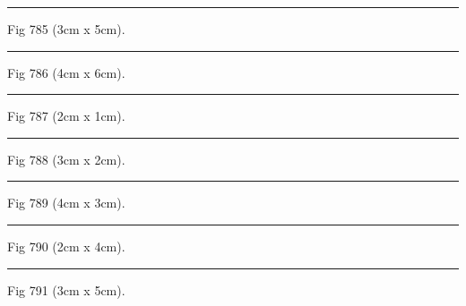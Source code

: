 \documentclass[a4paper,11pt]{article}
\begin{document}
\begin{swarmwrap}%
  \begin{minipage}[t]{3cm}
    \centering
    \rule{\linewidth}{5cm}
    {\footnotesize Fig 785 (3cm x 5cm).}
  \end{minipage}%
\end{swarmwrap}%
\swarmwrapnext
\lipsum[35]%

\begin{swarmwrap}%
  \begin{minipage}[t]{4cm}
    \centering
    \rule{\linewidth}{6cm}
    {\footnotesize Fig 786 (4cm x 6cm).}
  \end{minipage}%
\end{swarmwrap}%
\swarmwrapnext
\lipsum[36]%

\begin{swarmwrap}%
  \begin{minipage}[t]{2cm}
    \centering
    \rule{\linewidth}{1cm}
    {\footnotesize Fig 787 (2cm x 1cm).}
  \end{minipage}%
\end{swarmwrap}%
\swarmwrapnext
\lipsum[37]%

\begin{swarmwrap}%
  \begin{minipage}[t]{3cm}
    \centering
    \rule{\linewidth}{2cm}
    {\footnotesize Fig 788 (3cm x 2cm).}
  \end{minipage}%
\end{swarmwrap}%
\swarmwrapnext
\lipsum[38]%

\begin{swarmwrap}%
  \begin{minipage}[t]{4cm}
    \centering
    \rule{\linewidth}{3cm}
    {\footnotesize Fig 789 (4cm x 3cm).}
  \end{minipage}%
\end{swarmwrap}%
\swarmwrapnext
\lipsum[39]%

\begin{swarmwrap}%
  \begin{minipage}[t]{2cm}
    \centering
    \rule{\linewidth}{4cm}
    {\footnotesize Fig 790 (2cm x 4cm).}
  \end{minipage}%
\end{swarmwrap}%
\swarmwrapnext
\lipsum[40]%

\begin{swarmwrap}%
  \begin{minipage}[t]{3cm}
    \centering
    \rule{\linewidth}{5cm}
    {\footnotesize Fig 791 (3cm x 5cm).}
  \end{minipage}%
\end{swarmwrap}%
\swarmwrapnext
\lipsum[41]%
\end{document}
